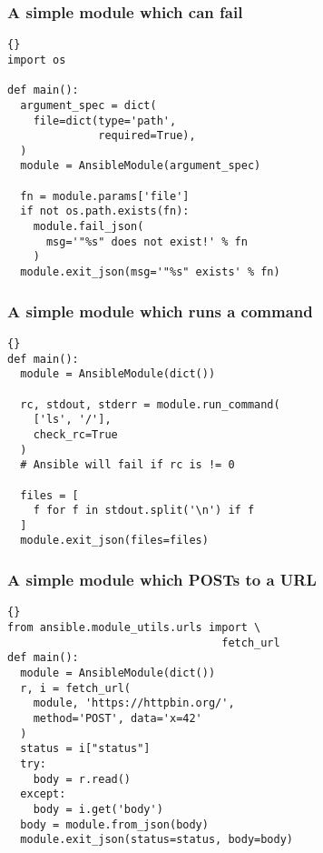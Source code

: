\documentclass{beamer}
\begin{document}
  \begin{frame}[fragile]
    \frametitle{A simple module which can fail}
\begin{lstlisting}{}
import os

def main():
  argument_spec = dict(
    file=dict(type='path',
              required=True),
  )
  module = AnsibleModule(argument_spec)

  fn = module.params['file']
  if not os.path.exists(fn):
    module.fail_json(
      msg='"%s" does not exist!' % fn
    )
  module.exit_json(msg='"%s" exists' % fn)
\end{lstlisting}
  \end{frame}

  \begin{frame}[fragile]
    \frametitle{A simple module which runs a command}
\begin{lstlisting}{}
def main():
  module = AnsibleModule(dict())

  rc, stdout, stderr = module.run_command(
    ['ls', '/'],
    check_rc=True
  )
  # Ansible will fail if rc is != 0

  files = [
    f for f in stdout.split('\n') if f
  ]
  module.exit_json(files=files)
\end{lstlisting}
  \end{frame}

  \begin{frame}[fragile]
    \frametitle{A simple module which POSTs to a URL}
\begin{lstlisting}{}
from ansible.module_utils.urls import \
                                 fetch_url
def main():
  module = AnsibleModule(dict())
  r, i = fetch_url(
    module, 'https://httpbin.org/',
    method='POST', data='x=42'
  )
  status = i["status"]
  try:
    body = r.read()
  except:
    body = i.get('body')
  body = module.from_json(body)
  module.exit_json(status=status, body=body)
\end{lstlisting}
  \end{frame}
\end{document}
